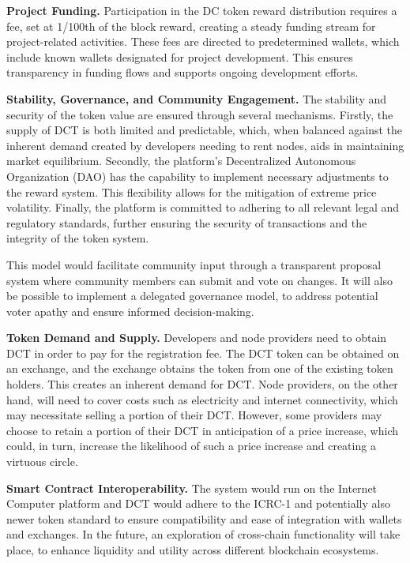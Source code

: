 {\bf Project Funding.}
Participation in the DC token reward distribution requires a fee, set at 1/100th of the block reward, creating a steady funding stream for project-related activities. These fees are directed to predetermined wallets, which include known wallets designated for project development. This ensures transparency in funding flows and supports ongoing development efforts.

{\bf Stability, Governance, and Community Engagement.}
The stability and security of the token value are ensured through several mechanisms. Firstly, the supply of DCT is both limited and predictable, which, when balanced against the inherent demand created by developers needing to rent nodes, aids in maintaining market equilibrium. Secondly, the platform's Decentralized Autonomous Organization (DAO) has the capability to implement necessary adjustments to the reward system. This flexibility allows for the mitigation of extreme price volatility. Finally, the platform is committed to adhering to all relevant legal and regulatory standards, further ensuring the security of transactions and the integrity of the token system.

This model would facilitate community input through a transparent proposal system where community members can submit and vote on changes. It will also be possible to implement a delegated governance model, to address potential voter apathy and ensure informed decision-making.

{\bf Token Demand and Supply.}
Developers and node providers need to obtain DCT in order to pay for the registration fee. The DCT token can be obtained on an exchange, and the exchange obtains the token from one of the existing token holders. This creates an inherent demand for DCT. Node providers, on the other hand, will need to cover costs such as electricity and internet connectivity, which may necessitate selling a portion of their DCT. However, some providers may choose to retain a portion of their DCT in anticipation of a price increase, which could, in turn, increase the likelihood of such a price increase and creating a virtuous circle.

{\bf Smart Contract Interoperability.}
The system would run on the Internet Computer platform and DCT would adhere to the ICRC-1 and potentially also newer token standard to ensure compatibility and ease of integration with wallets and exchanges. In the future, an exploration of cross-chain functionality will take place, to enhance liquidity and utility across different blockchain ecosystems.

